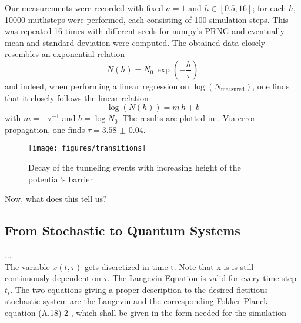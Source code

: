 Our measurements were recorded with fixed $a=1$ and $h\in[0.5,16]$; for each
$h$, \num{10000} mutlisteps were performed, each consisting of 100 simulation
steps. This was repeated 16 times with different seeds for numpy's PRNG and
eventually mean and standard deviation were computed. The obtained data closely
resembles an exponential relation
\begin{equation*}
    N(h)=N_0\,\exp\left(-\frac{h}{\tau}\right)
\end{equation*}
and indeed, when performing a linear regression on
$\log(N_{\mathrm{measured}})$, one finds that it closely follows the linear
relation
\begin{equation*}
    \log\left(N(h)\right)=m\,h+b
\end{equation*}
with $m=-\tau^{-1}$ and $b=\log{N_0}$. The results are plotted in
. Via error propagation, one finds
$\tau=\num{3.58(4)}$.

\begin{figure}[h]
    \centering
    \texttt{[image: figures/transitions]}
    \caption{Decay of the tunneling events with increasing height of the potential's barrier}
    \label{fig:transitions}
\end{figure}

Now, what does this tell us?

\vspace{3\baselineskip}

\newpage
\subsection{From Stochastic to Quantum Systems}
...\\
\noindent The variable $x(t,\tau)$ gets discretized in time t. Note that x is is still continuously dependent on $\tau$. The Langevin-Equation is valid for every time step $t_i$. The two equations giving a proper description to the desired fictitious stochastic system
are the Langevin and the corresponding Fokker-Planck equation (A.18) 2 , which shall be
given in the form needed for the simulation

